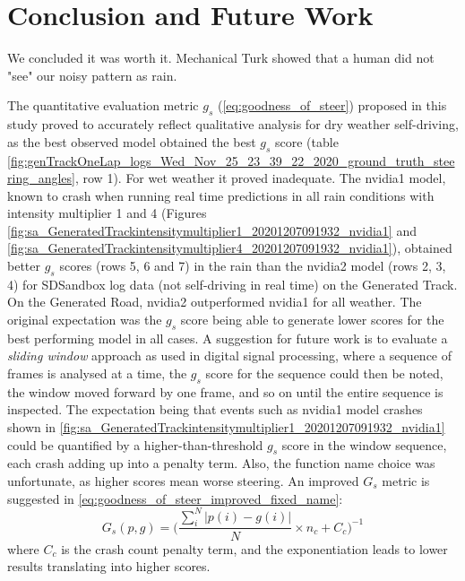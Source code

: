 \section{Conclusion and Future Work}

We concluded it was worth it.
Mechanical Turk showed that a human did not "see" our noisy pattern as rain.

The quantitative evaluation metric $g_s$ (\ref{eq:goodness_of_steer}) proposed in this study proved to accurately reflect qualitative analysis for dry weather self-driving, as the best observed model obtained the best $g_s$ score (table  \ref{fig:genTrackOneLap_logs_Wed_Nov_25_23_39_22_2020_ground_truth_steering_angles}, row 1). For wet weather it proved inadequate. 
The nvidia1 model, known to crash when running real time predictions in all rain conditions with intensity multiplier 1 and 4 (Figures
\ref{fig:sa_GeneratedTrackintensitymultiplier1_20201207091932_nvidia1} and  \ref{fig:sa_GeneratedTrackintensitymultiplier4_20201207091932_nvidia1}), obtained better $g_s$ scores (rows 5, 6 and 7) in the rain than the nvidia2 model (rows 2, 3, 4) for SDSandbox log data (not self-driving in real time) on the Generated Track. On the Generated Road, nvidia2 outperformed nvidia1 for all weather. The original expectation was the $g_s$ score being able to generate lower scores for the best performing model in all cases. A suggestion for future work is to evaluate a \textit{sliding window} approach as used in digital signal processing, where a sequence of frames is analysed at a time, the $g_s$ score for the sequence could then be noted, the window moved forward by one frame, and so on until the entire sequence is inspected. The expectation being that events such as nvidia1 model crashes shown in \ref{fig:sa_GeneratedTrackintensitymultiplier1_20201207091932_nvidia1} could be quantified by a higher-than-threshold $g_s$ score in the window sequence, each crash adding up into a penalty term. Also, the function name choice was unfortunate, as higher scores mean worse steering. An improved $G_s$ metric is suggested in \ref{eq:goodness_of_steer_improved_fixed_name}:
\begin{equation}
    \label{eq:goodness_of_steer_improved_fixed_name}
    G_s(p,g) = \Bigg(\frac{\sum_i^N \lvert p(i)-g(i) \rvert }{N} \times n_c + C_c\Bigg)^{-1}
\end{equation}
where $C_c$ is the crash count penalty term, and the exponentiation leads to lower results translating into higher scores.